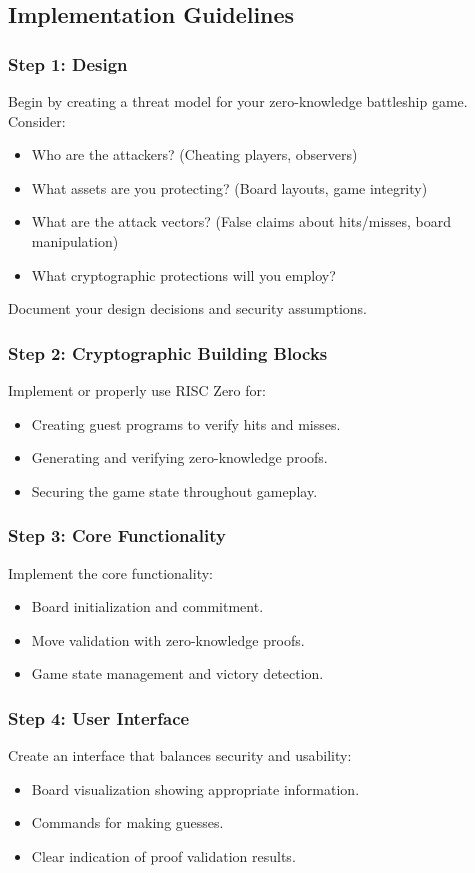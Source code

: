 \documentclass[10pt,a4paper,american]{article}
\begin{document}
\subsection*{Implementation Guidelines}

\subsubsection*{Step 1: Design}
Begin by creating a threat model for your zero-knowledge battleship game. Consider:
\begin{itemize}
	\item Who are the attackers? (Cheating players, observers)
	\item What assets are you protecting? (Board layouts, game integrity)
	\item What are the attack vectors? (False claims about hits/misses, board manipulation)
	\item What cryptographic protections will you employ?
\end{itemize}

Document your design decisions and security assumptions.

\subsubsection*{Step 2: Cryptographic Building Blocks}
Implement or properly use RISC Zero for:
\begin{itemize}
	\item Creating guest programs to verify hits and misses.
	\item Generating and verifying zero-knowledge proofs.
	\item Securing the game state throughout gameplay.
\end{itemize}

\subsubsection*{Step 3: Core Functionality}
Implement the core functionality:
\begin{itemize}
	\item Board initialization and commitment.
	\item Move validation with zero-knowledge proofs.
	\item Game state management and victory detection.
\end{itemize}

\subsubsection*{Step 4: User Interface}
Create an interface that balances security and usability:
\begin{itemize}
	\item Board visualization showing appropriate information.
	\item Commands for making guesses.
	\item Clear indication of proof validation results.
\end{itemize}
\end{document}
